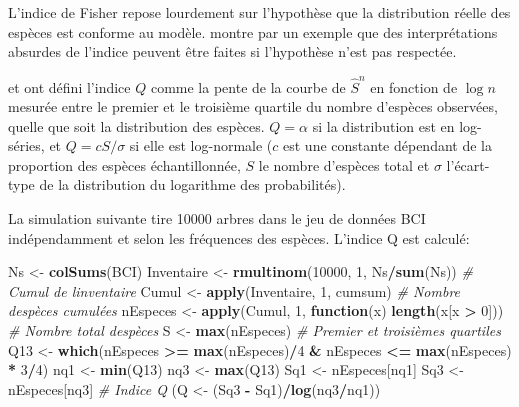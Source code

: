 \documentclass[
  11pt,
  french,
  a4paper,
  extrafontsizes,onecolumn,openright
  ]{memoir}
\newenvironment{Shaded}{\begin{snugshade}}{\end{snugshade}}
\newcommand{\CommentTok}[1]{\textcolor[rgb]{0.56,0.35,0.01}{\textit{#1}}}
\newcommand{\ControlFlowTok}[1]{\textcolor[rgb]{0.13,0.29,0.53}{\textbf{#1}}}
\newcommand{\DecValTok}[1]{\textcolor[rgb]{0.00,0.00,0.81}{#1}}
\newcommand{\FunctionTok}[1]{\textcolor[rgb]{0.13,0.29,0.53}{\textbf{#1}}}
\newcommand{\NormalTok}[1]{#1}
\newcommand{\OtherTok}[1]{\textcolor[rgb]{0.56,0.35,0.01}{#1}}
\newcommand{\SpecialCharTok}[1]{\textcolor[rgb]{0.81,0.36,0.00}{\textbf{#1}}}
\begin{document}
L'indice de Fisher repose lourdement sur l'hypothèse que la distribution réelle des espèces est conforme au modèle.
\textcite{Jost2007} montre par un exemple que des interprétations absurdes de l'indice peuvent être faites si l'hypothèse n'est pas respectée.

\textcite{Kempton1976} et \textcite{Kempton1978} ont défini l'indice \(Q\) comme la pente de la courbe de \(\hat{S}^{n}\) en fonction de \(\log{n}\) mesurée entre le premier et le troisième quartile du nombre d'espèces observées, quelle que soit la distribution des espèces.
\(Q = \alpha\) si la distribution est en log-séries, et \(Q = {c S}/{\sigma}\) si elle est log-normale (\(c\) est une constante dépendant de la proportion des espèces échantillonnée, \(S\) le nombre d'espèces total et \(\sigma\) l'écart-type de la distribution du logarithme des probabilités).

La simulation suivante tire 10000 arbres dans le jeu de données BCI indépendamment et selon les fréquences des espèces.
L'indice Q est calculé:

\scriptsize

\begin{Shaded}
\begin{Highlighting}[]
\NormalTok{Ns }\OtherTok{\textless{}{-}} \FunctionTok{colSums}\NormalTok{(BCI)}
\NormalTok{Inventaire }\OtherTok{\textless{}{-}} \FunctionTok{rmultinom}\NormalTok{(}\DecValTok{10000}\NormalTok{, }\DecValTok{1}\NormalTok{, Ns}\SpecialCharTok{/}\FunctionTok{sum}\NormalTok{(Ns))}
\CommentTok{\# Cumul de l\textquotesingle{}inventaire}
\NormalTok{Cumul }\OtherTok{\textless{}{-}} \FunctionTok{apply}\NormalTok{(Inventaire, }\DecValTok{1}\NormalTok{, cumsum)}
\CommentTok{\# Nombre d\textquotesingle{}espèces cumulées}
\NormalTok{nEspeces }\OtherTok{\textless{}{-}} \FunctionTok{apply}\NormalTok{(Cumul, }\DecValTok{1}\NormalTok{, }\ControlFlowTok{function}\NormalTok{(x) }\FunctionTok{length}\NormalTok{(x[x }\SpecialCharTok{\textgreater{}} \DecValTok{0}\NormalTok{]))}
\CommentTok{\# Nombre total d\textquotesingle{}espèces}
\NormalTok{S }\OtherTok{\textless{}{-}} \FunctionTok{max}\NormalTok{(nEspeces)}
\CommentTok{\# Premier et troisièmes quartiles}
\NormalTok{Q13 }\OtherTok{\textless{}{-}} \FunctionTok{which}\NormalTok{(nEspeces }\SpecialCharTok{\textgreater{}=} \FunctionTok{max}\NormalTok{(nEspeces)}\SpecialCharTok{/}\DecValTok{4} \SpecialCharTok{\&}\NormalTok{ nEspeces }\SpecialCharTok{\textless{}=} \FunctionTok{max}\NormalTok{(nEspeces) }\SpecialCharTok{*}
    \DecValTok{3}\SpecialCharTok{/}\DecValTok{4}\NormalTok{)}
\NormalTok{nq1 }\OtherTok{\textless{}{-}} \FunctionTok{min}\NormalTok{(Q13)}
\NormalTok{nq3 }\OtherTok{\textless{}{-}} \FunctionTok{max}\NormalTok{(Q13)}
\NormalTok{Sq1 }\OtherTok{\textless{}{-}}\NormalTok{ nEspeces[nq1]}
\NormalTok{Sq3 }\OtherTok{\textless{}{-}}\NormalTok{ nEspeces[nq3]}
\CommentTok{\# Indice Q}
\NormalTok{(Q }\OtherTok{\textless{}{-}}\NormalTok{ (Sq3 }\SpecialCharTok{{-}}\NormalTok{ Sq1)}\SpecialCharTok{/}\FunctionTok{log}\NormalTok{(nq3}\SpecialCharTok{/}\NormalTok{nq1))}
\end{Highlighting}
\end{Shaded}
\end{document}

